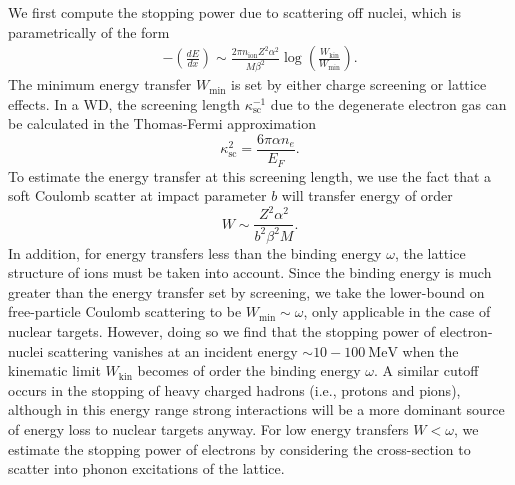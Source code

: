 \documentclass[twocolumn,preprintnumbers,amsmath,amssymb,prl, superscriptaddress]{revtex4}
\newcommand{\MeV}{\text{MeV}}
\def\r{\right)}
\def\l{\left(}
\begin{document}
\begin{appendices}
We first compute the stopping power due to scattering off nuclei, which is parametrically of the form
\begin{align}
\label{eq:SP}
  - \l \frac{dE}{dx}\r \sim \frac{2 \pi n_\text{ion} Z^2 \alpha^2}{M \beta^2}
    \log {\l\frac{W_\text{kin}}{W_\text{min}}\r}.
\end{align}
The minimum energy transfer $W_\text{min}$ is set by either charge screening or lattice effects.
In a WD, the screening length $\kappa_{\text{sc}}^{-1}$ due to the degenerate electron gas can be calculated in the Thomas-Fermi approximation \cite{Teukolsky}
\begin{equation}
\label{eq:TF}
\kappa_{\text{sc}}^{2} = \frac{6 \pi \alpha n_e}{E_F}.
\end{equation}
To estimate the energy transfer at this screening length, we use the fact that a soft Coulomb scatter at impact parameter $b$ will transfer energy of order
\begin{equation}
\label{eq:impact}
  W \sim \frac{Z^2 \alpha^2}{b^2 \beta^2 M}.
\end{equation}
In addition, for energy transfers less than the binding energy $\omega$, the lattice structure of ions must be taken into account.
Since the binding energy is much greater than the energy transfer set by screening, we take the lower-bound on free-particle Coulomb scattering to be $W_\text{min} \sim \omega$, only applicable in the case of nuclear targets.
However, doing so we find that the stopping power of electron-nuclei scattering vanishes at an incident energy $\sim 10 - 100 ~\MeV$ when the kinematic limit $W_\text{kin}$ becomes of order the binding energy $\omega$.
A similar cutoff occurs in the stopping of heavy charged hadrons (i.e., protons and pions), although in this energy range strong interactions will be a more dominant source of energy loss to nuclear targets anyway.
For low energy transfers $W < \omega$, we estimate the stopping power of electrons by considering the cross-section to scatter into phonon excitations of the lattice.


\end{appendices}
\end{document}
